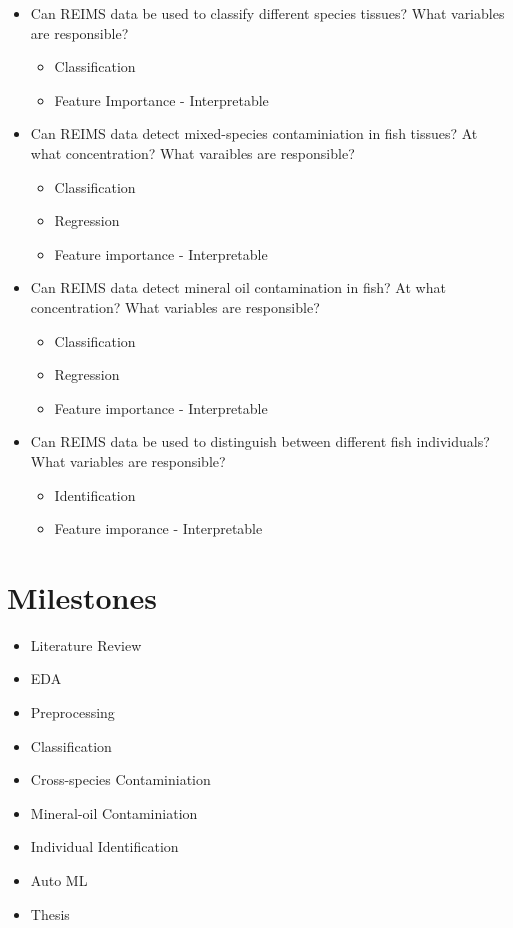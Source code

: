 \documentclass{article}
\begin{document}
\begin{itemize}
  \item Can REIMS data be used to classify different species tissues? What variables are responsible?
  \begin{itemize}
    \item Classification 
    \item Feature Importance - Interpretable 
  \end{itemize}
  \item Can REIMS data detect mixed-species contaminiation in fish tissues? At what concentration? What varaibles are responsible? 
  \begin{itemize}
    \item Classification 
    \item Regression 
    \item Feature importance - Interpretable
  \end{itemize}
  \item Can REIMS data detect mineral oil contamination in fish? At what concentration? What variables are responsible?
  \begin{itemize}
    \item Classification 
    \item Regression 
    \item Feature importance - Interpretable 
  \end{itemize}
  \item Can REIMS data be used to distinguish between different fish individuals? What variables are responsible?
  \begin{itemize}
    \item Identification 
    \item Feature imporance - Interpretable 
  \end{itemize}
\end{itemize}

\section{Milestones}
\label{sec:milestones}

\begin{itemize}
  \item Literature Review 
  \item EDA 
  \item Preprocessing 
  \item Classification 
  \item Cross-species Contaminiation 
  \item Mineral-oil Contaminiation  
  \item Individual Identification 
  \item Auto ML 
  \item Thesis 
\end{itemize}
\end{document}
